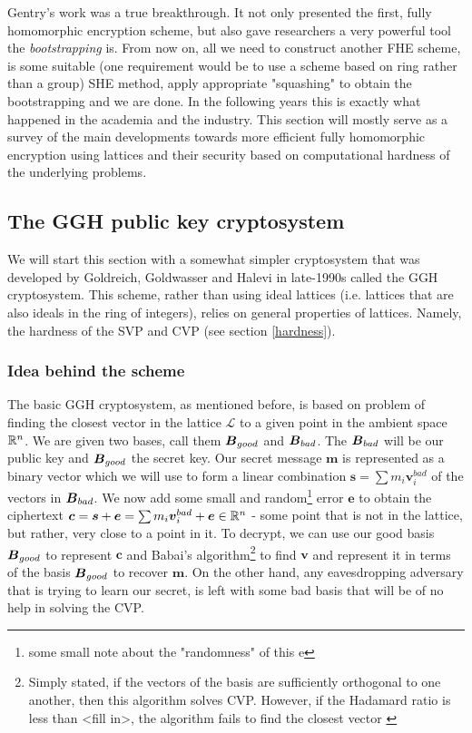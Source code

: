 Gentry's work was a true breakthrough. It not only presented the first, fully homomorphic encryption scheme, but also gave researchers a very powerful tool the \textit{bootstrapping} is. From now on, all we need to construct another FHE scheme, is some suitable (one requirement would be to use a scheme based on ring rather than a group) SHE method, apply appropriate "squashing" to obtain the bootstrapping and we are done. In the following years this is exactly what happened in the academia and the industry. This section will mostly serve as a survey of the main developments towards more efficient fully homomorphic encryption using lattices and their security based on computational hardness of the underlying problems.

\subsection{The GGH public key cryptosystem}
We will start this section with a somewhat simpler cryptosystem that was developed by Goldreich, Goldwasser and Halevi in late-1990s \cite{ggh} called the GGH cryptosystem. This scheme, rather than using ideal lattices (i.e. lattices that are also ideals in the ring of integers), relies on general properties of lattices. Namely, the hardness of the SVP and CVP (see section \ref{hardness}).

\subsubsection*{Idea behind the scheme}
The basic GGH cryptosystem, as mentioned before, is based on problem of finding the closest vector in the lattice $\mathcal{L}$ to a given point in the ambient space $\mathbb{R}^n$. We are given two bases, call them $\boldsymbol{B}_{good}$ and $\boldsymbol{B}_{bad}$. The $\boldsymbol{B}_{bad}$ will be our public key and $\boldsymbol{B}_{good}$ the secret key. Our secret message $\bm{m}$ is represented as a binary vector which we will use to form a linear combination $\bm{s} = \sum m_i \bm{v}_i^{bad}$ of the vectors in $\boldsymbol{B}_{bad}$. We now add some small and random\footnote{some small note about the "randomness" of this e} error $\bm{e}$ to obtain the ciphertext $\boldsymbol{c} = \boldsymbol{s} + \boldsymbol{e} = \sum m_i \boldsymbol{v}_i^{bad} + \boldsymbol{e} \in \mathbb{R}^n$ - some point that is not in the lattice, but rather, very close to a point in it.
To decrypt, we can use our good basis $\boldsymbol{B}_{good}$ to represent $\bm{c}$ and Babai's algorithm\footnote{Simply stated, if the vectors of the basis are sufficiently orthogonal to one another, then this algorithm solves CVP. However, if the Hadamard ratio is less than <fill in>, the algorithm fails to find the closest vector \cite{babai}} to find $\bm{v}$ and represent it in terms of the basis $\boldsymbol{B}_{good}$  to recover $\bm{m}$. On the other hand, any eavesdropping adversary that is trying to learn our secret, is left with some bad basis that will be of no help in solving the CVP.

